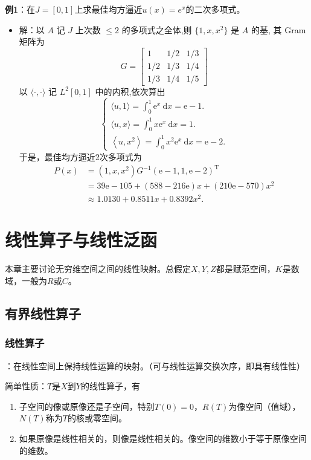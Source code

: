 \documentclass[12pt,a4paper]{article}
\begin{document}
\textbf{例1}：在$J=[0,1]$上求最佳均方逼近$u(x)=e^x$的二次多项式。
\begin{itemize}
	\item []
	解：以 $A$ 记 $J$ 上次数 $\leqslant 2$ 的多项式之全体,则 $\{1, x, x^{2}\}$ 是 $A$ 的基, 其 Gram 矩阵为
	$$
G=\left[\begin{array}{ccc}
1 & 1 / 2 & 1 / 3 \\
1 / 2 & 1 / 3 & 1 / 4 \\
1 / 3 & 1 / 4 & 1 / 5
\end{array}\right]
$$
以 $\langle \cdot, \cdot\rangle$ 记 $L^{2}[0,1]$ 中的内积,依次算出
$$
\left\{\begin{array}{l}
\langle u, 1\rangle=\int_{0}^{1} \mathrm{e}^{x} \mathrm{~d} x=\mathrm{e}-1 . \\
\langle u, x\rangle=\int_{0}^{1} x \mathrm{e}^{x} \mathrm{~d} x=1 . \\
\left\langle u, x^{2}\right\rangle=\int_{0}^{1} x^{2} \mathrm{e}^{x} \mathrm{~d} x=\mathrm{e}-2 .
\end{array}\right.
$$
于是，最佳均方逼近2次多项式为
$$
\begin{aligned}
P(x) &=\left(1, x, x^{2}\right) G^{-1}(\mathrm{e}-1,1, \mathrm{e}-2)^{\mathrm{T}} \\
&=39 \mathrm{e}-105+(588-216 \mathrm{e}) x+(210 \mathrm{e}-570) x^{2} \\
& \approx 1.0130+0.8511 x+0.8392 x^{2} .
\end{aligned}
$$
\end{itemize}


\section{线性算子与线性泛函}
本章主要讨论无穷维空间之间的线性映射。总假定$X,Y,Z$都是赋范空间，$K$是数域，一般为$R$或$C$。
\subsection{有界线性算子}
\subsubsection{线性算子}：在线性空间上保持线性运算的映射。（可与线性运算交换次序，即具有线性性）

简单性质：$T$是$X$到$Y$的线性算子，有
\begin{enumerate}
	\item 子空间的像或原像还是子空间，特别$T(0)=0$，$R(T)$为像空间（值域），$N(T)$称为$T$的核或零空间。
	\item 如果原像是线性相关的，则像是线性相关的。像空间的维数小于等于原像空间的维数。
\end{enumerate}
\end{document}
